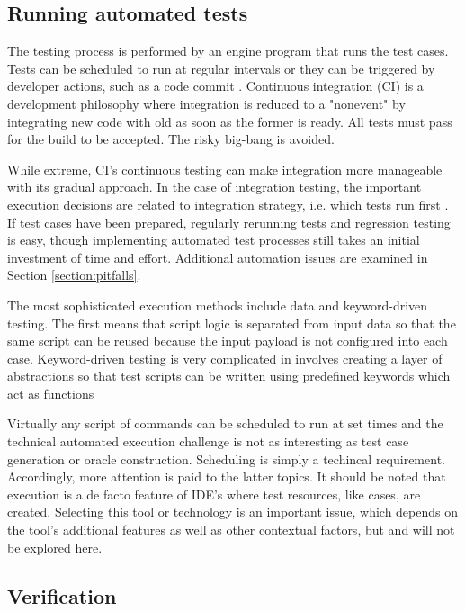 \documentclass[12pt,a4paper,oneside,pdftex]{report}
\begin{document}
\subsection{Running automated tests}

The testing process is performed by an engine program that runs the test cases. Tests can be scheduled to run at regular intervals or they can be triggered by developer actions, such as a code commit \citep{pezze2008software}. Continuous integration (CI) is a development philosophy where integration is reduced to a "nonevent" by integrating new code with old as soon as the former is ready. All tests must pass for the build to be accepted. \citep{duvall2007continuous} The risky big-bang is avoided.

While extreme, CI's continuous testing can make integration more manageable with its gradual approach. In the case of integration testing, the important execution decisions are related to integration strategy, i.e. which tests run first \citep{duvall2007continuous}. If test cases have been prepared, regularly rerunning tests and regression testing is easy, though implementing automated test processes still takes an initial investment of time and effort. Additional automation issues are examined in Section \ref{section:pitfalls}.

The most sophisticated execution methods include data and keyword-driven testing. The first means that script logic is separated from input data so that the same script can be reused because the input payload is not configured into each case. Keyword-driven testing is very complicated in involves creating a layer of abstractions so that test scripts can be written using predefined keywords which act as functions 

Virtually any script of commands can be scheduled to run at set times and the technical automated execution challenge is not as interesting as test case generation or oracle construction. Scheduling is simply a techincal requirement. Accordingly, more attention is paid to the latter topics. It should be noted that execution is a de facto feature of IDE's where test resources, like cases, are created. Selecting this tool or technology is an important issue, which depends on the tool's additional features as well as other contextual factors, but and will not be explored here.

\subsection{Verification}
\end{document}
